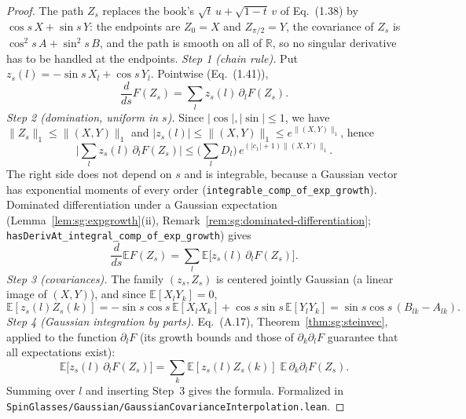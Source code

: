 \begin{proof}
  \leanok
The path $Z_s$ replaces the book's $\sqrt t\,u+\sqrt{1-t}\,v$ of Eq.~(1.38) by $\cos s\,X+\sin s\,Y$: the endpoints are $Z_0=X$ and $Z_{\pi/2}=Y$, the covariance of $Z_s$ is $\cos^2s\,A+\sin^2s\,B$, and the path is smooth on all of $\mathbb R$, so no singular derivative has to be handled at the endpoints.
\emph{Step 1 (chain rule).} Put $z_s(l)=-\sin s\,X_l+\cos s\,Y_l$. Pointwise (Eq.~(1.41)),
\[
\frac d{ds}F(Z_s)=\sum_l z_s(l)\,\partial_lF(Z_s).
\]
\emph{Step 2 (domination, uniform in $s$).} Since $|\cos|,|\sin|\le1$, we have $\|Z_s\|_1\le\|(X,Y)\|_1$ and $|z_s(l)|\le\|(X,Y)\|_1\le e^{\|(X,Y)\|_1}$, hence
\[
\Big|\sum_lz_s(l)\,\partial_lF(Z_s)\Big|\le\Big(\sum_lD_l\Big)\,e^{(|c_1|+1)\|(X,Y)\|_1}.
\]
The right side does not depend on $s$ and is integrable, because a Gaussian vector has exponential moments of every order (\texttt{integrable\_comp\_of\_exp\_growth}). Dominated differentiation under a Gaussian expectation (Lemma~\ref{lem:sg:expgrowth}(ii), Remark~\ref{rem:sg:dominated-differentiation}; \texttt{hasDerivAt\_integral\_comp\_of\_exp\_growth}) gives
\[
\frac d{ds}\mathbb{E}F(Z_s)=\sum_l\mathbb{E}\big[z_s(l)\,\partial_lF(Z_s)\big].
\]
\emph{Step 3 (covariances).} The family $(z_s,Z_s)$ is centered jointly Gaussian (a linear image of $(X,Y)$), and since $\mathbb{E}[X_lY_k]=0$,
\[
\mathbb{E}[z_s(l)Z_s(k)]=-\sin s\cos s\,\mathbb{E}[X_lX_k]+\cos s\sin s\,\mathbb{E}[Y_lY_k]=\sin s\cos s\,(B_{lk}-A_{lk}).
\]
\emph{Step 4 (Gaussian integration by parts).} Eq.~(A.17), Theorem~\ref{thm:sg:steinvec}, applied to the function $\partial_lF$ (its growth bounds and those of $\partial_k\partial_lF$ guarantee that all expectations exist):
\[
\mathbb{E}\big[z_s(l)\,\partial_lF(Z_s)\big]=\sum_k\mathbb{E}[z_s(l)Z_s(k)]\;\mathbb{E}\,\partial_k\partial_lF(Z_s).
\]
Summing over $l$ and inserting Step~3 gives the formula.
Formalized in \texttt{SpinGlasses/Gaussian/GaussianCovarianceInterpolation.lean}.
\end{proof}

